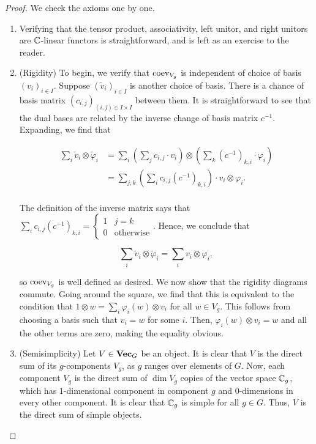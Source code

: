 \documentclass{article}
\theoremstyle{definition}
\numberwithin{figure}{section}
\begin{document}
\begin{proof} We check the axioms one by one.

\begin{enumerate}
\item Verifying that the tensor product, associativity, left unitor, and right unitors are $\mathbb{C}$-linear functors is straightforward, and is left as an exercise to the reader.

\item (Rigidity) To begin, we verify that $\mathrm{coev}_{V_g}$ is independent of choice of basis $\left(v_i\right)_{i\in I}$. Suppose $\left(\tilde{v}_i\right)_{i\in I}$ is another choice of basis. There is a chance of basis matrix $(c_{i,j})_{(i,j)\in I\times I}$ between them. It is straightforward to see that the dual bases are related by the inverse change of basis matrix $c^{-1}$. Expanding, we find that

\begin{align*}
\sum_{i}\tilde{v}_i\otimes \tilde{\varphi}_i&=\sum_{i}\left(\sum_{j}c_{i,j}\cdot v_i\right)\otimes \left(\sum_{k}(c^{-1})_{k,i}\cdot \varphi_i\right)\\
&=\sum_{j,k} \left(\sum_{i}c_{i,j}(c^{-1})_{k,i}\right)\cdot v_i\otimes \varphi_i.\\
\end{align*}

The definition of the inverse matrix says that $\sum_{i}c_{i,j}(c^{-1})_{k,i}=\begin{cases}1 & j=k \\ 0 &\text{otherwise}\end{cases}$. Hence, we conclude that

$$\sum_{i}\tilde{v}_i\otimes \tilde{\varphi}_i=\sum_{i}v_i\otimes \varphi_i,$$

so $\mathrm{coev}_{V_g}$ is well defined as desired. We now show that the rigidity diagrams commute. Going around the square, we find that this is equivalent to the condition that $1\otimes w=\sum_{i}\varphi_i(w)\otimes v_i$ for all $w\in V_g$. This follows from choosing a basis such that $v_i=w$ for some $i$. Then, $\varphi_i(w)\otimes v_i=w$ and all the other terms are zero, making the equality obvious.

\item (Semisimplicity) Let $V\in \bold{Vec}_G$ be an object. It is clear that $V$ is the direct sum of its $g$-components $V_g$, as $g$ ranges over elements of $G$. Now, each component $V_g$ is the direct sum of $\dim V_g$ copies of the vector space $\mathbb{C}_g$, which has $1$-dimensional component in component $g$ and $0$-dimensions in every other component. It is clear that $\mathbb{C}_g$ is simple for all $g\in G$. Thus, $V$ is the direct sum of simple objects.


\end{enumerate}
\end{proof}
\end{document}
